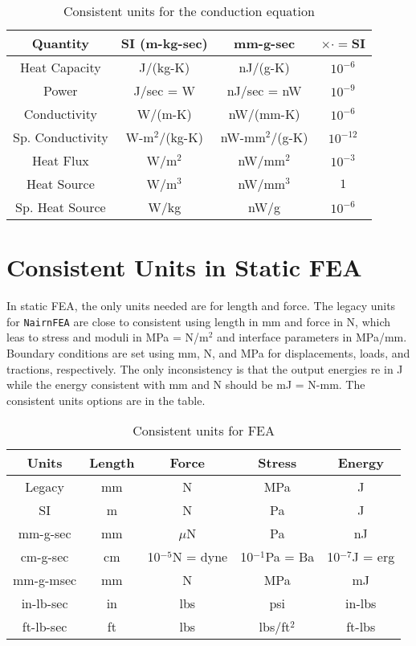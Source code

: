 \documentclass[11pt]{article}
\begin{document}
\begin{table}
\caption{Consistent units for the conduction equation}
\begin{center}
\begin{tabular}{||c||c||c|c||}
\hline
Quantity & SI (m-kg-sec) & mm-g-sec & $\times\cdot=$SI \\
\hline
Heat Capacity & J/(kg-K) & nJ/(g-K) & $10^{-6}$ \\
Power & J/sec = W & nJ/sec = nW  & $10^{-9}$ \\
Conductivity & W/(m-K) & nW/(mm-K) & $10^{-6}$ \\
Sp. Conductivity & W-m$^2$/(kg-K) & nW-mm$^2$/(g-K) & $10^{-12}$ \\
Heat Flux & W/m$^2$ & nW/mm$^2$ & $10^{-3}$\\
Heat Source & W/m$^3$ & nW/mm$^3$  & $1$ \\
Sp. Heat Source & W/kg & nW/g  & $10^{-6}$ \\
\hline
\end{tabular}
\end{center}
\label{units}
\end{table}

\section{Consistent Units in Static FEA}

In static FEA, the only units needed are for length and force. The legacy units for {\tt NairnFEA} are close to consistent using length in mm and force in N, which leas to stress and moduli in MPa = N/m$^2$ and interface parameters in MPa/mm. Boundary conditions are set using mm, N, and MPa for displacements, loads, and tractions, respectively. The only inconsistency is that the output energies re in J while the energy consistent with mm and N should be mJ = N-mm. The consistent units options are in the table.

\begin{table}
\caption{Consistent units for FEA}
\begin{center}
\begin{tabular}{|c|c|c|c|c|}
\hline
Units & Length & Force & Stress & Energy \\
\hline
Legacy & mm & N & MPa & J \\
SI & m & N & Pa & J \\
mm-g-sec & mm & $\mu$N & Pa & nJ \\
cm-g-sec & cm & 10$^{-5}$N = dyne & 10$^{-1}$Pa = Ba & 10$^{-7}$J = erg \\
mm-g-msec & mm & N & MPa & mJ \\
in-lb-sec & in & lbs & psi & in-lbs \\
ft-lb-sec & ft & lbs & lbs/ft$^2$ & ft-lbs \\
\hline
\end{tabular}
\end{center}
\label{units}
\end{table}
\end{document}
